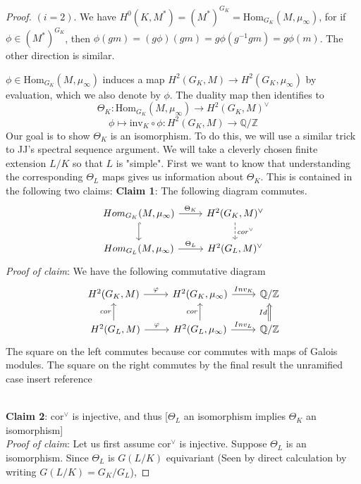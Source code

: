 \documentclass[class=article, crop=false]{standalone}
\begin{document}
\begin{proof}
$(i=2)$. We have $H^0(K,M^*)=(M^*)^{G_K}=\text{Hom}_{G_K}(M, \mu_{\infty})$, for if $\phi \in (M^*)^{G_K}$, then $\phi(gm)=(g\phi)(gm)=g\phi(g^{-1}gm)=g\phi(m)$. The other direction is similar.
\par 
$\phi \in \text{Hom}_{G_K}(M,\mu_{\infty})$ induces a map $H^2(G_K,M) \to H^2(G_K,\mu_{\infty})$ by evaluation, which we also denote by $\phi$. The duality map then identifies to
\[\Theta_K:\text{Hom}_{G_K}(M, \mu_{\infty}) \to H^2(G_K,M)^{\vee}\]
\[\phi \mapsto \text{inv}_K\circ \phi :H^2(G_K,M)\to \mathbb{Q}/\mathbb{Z}\]
Our goal is to show $\Theta_K$ is an isomorphism. To do this, we will use a similar trick to JJ's spectral sequence argument. We will take a cleverly chosen finite extension $L/K$ so that $L$ is "simple". First we want to know that understanding the corresponding $\Theta_L$ maps gives us information about $\Theta_K$. This is contained in the following two claims:
\vskip 5pt
\textbf{Claim 1}: The following diagram commutes.
\[\begin{tikzcd}
{Hom_{G_K}(M,\mu_{\infty})} \arrow[r, "\Theta_K"] \arrow[d, hook] & {H^2(G_K, M)^{\vee}} \arrow[d, "cor^{\vee}", dashed] \\
{Hom_{G_L}(M,\mu_{\infty})} \arrow[r, "\Theta_L"]                 & {H^2(G_L,M)^{\vee}}                                 
\end{tikzcd}\]
\textit{Proof of claim}: We have the following commutative diagram
\[\begin{tikzcd}
 {H^2(G_K,M)} \arrow[r, "\varphi"] & {H^2(G_K,\mu_{\infty})} \arrow[r, "Inv_K"]                    & \mathbb{Q}/\mathbb{Z}                             \\\
 {H^2(G_L,M) } \arrow[r, "\varphi"] \arrow[u, "cor"] & 
 {H^2(G_L,\mu_{\infty})} \arrow[r, "Inv_L"] \arrow[u, "cor"] & \mathbb{Q}/\mathbb{Z} \arrow[u, "Id", Rightarrow]
\end{tikzcd}\]
The square on the left commutes because cor commutes with maps of Galois modules. 
The square on the right commutes by the final result the unramified 
case {\color{red} insert reference}
\par 
\mbox{}\hfill \qedsymbol
\\
\textbf{Claim 2}: $\text{cor}^{\vee}$ is injective, and thus [$\Theta_L$ an isomorphism implies $\Theta_K$ an isomorphism]
\\
\textit{Proof of claim}: Let us first assume cor$^{\vee}$ is injective. Suppose $\Theta_L$ is an isomorphism. Since $\Theta_L$ is $G(L/K)$ equivariant (Seen by direct calculation by writing $G(L/K)=G_K/G_L$),

\end{proof}
\end{document}

